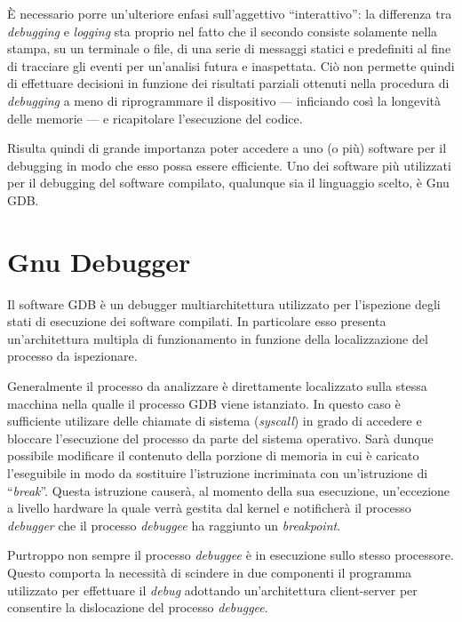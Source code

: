 È necessario porre un'ulteriore enfasi sull'aggettivo ``interattivo'': la differenza tra \textit{debugging} e \textit{logging} sta proprio nel fatto che il secondo consiste solamente nella stampa, su un terminale o file, di una serie di messaggi statici e predefiniti al fine di tracciare gli eventi per un'analisi futura e inaspettata. Ciò non permette quindi di effettuare decisioni in funzione dei risultati parziali ottenuti nella procedura di \textit{debugging} a meno di riprogrammare il dispositivo --- inficiando così la longevità delle memorie --- e ricapitolare l'esecuzione del codice.

Risulta quindi di grande importanza poter accedere a uno (o più) software per il debugging in modo che esso possa essere efficiente.
Uno dei software più utilizzati per il debugging del software compilato, qualunque sia il linguaggio scelto, è Gnu GDB\cite{site:gdb}.

\section{Gnu Debugger}\label{sec:gdb}

Il software GDB è un debugger multiarchitettura\cite{site:gdb} utilizzato per l'ispezione degli stati di esecuzione dei software compilati.
In particolare esso presenta un'architettura multipla di funzionamento in funzione della localizzazione del processo da ispezionare.

Generalmente il processo da analizzare è direttamente localizzato sulla stessa macchina nella qualle il processo GDB viene istanziato. In questo caso è sufficiente utilizare delle chiamate di sistema (\textit{syscall}) in grado di accedere e bloccare l'esecuzione del processo da parte del sistema operativo.
Sarà dunque possibile modificare il contenuto della porzione di memoria in cui è caricato l'eseguibile in modo da sostituire l'istruzione incriminata con un'istruzione di ``\textit{break}''. Questa istruzione causerà, al momento della sua esecuzione, un'eccezione a livello hardware la quale verrà gestita dal kernel e notificherà il processo \textit{debugger} che il processo \textit{debuggee} ha raggiunto un \textit{breakpoint}.

Purtroppo non sempre il processo \textit{debuggee} è in esecuzione sullo stesso processore. Questo comporta la necessità di scindere in due componenti il programma utilizzato per effettuare il \textit{debug} adottando un'architettura client-server per consentire la dislocazione del processo \textit{debuggee}.

